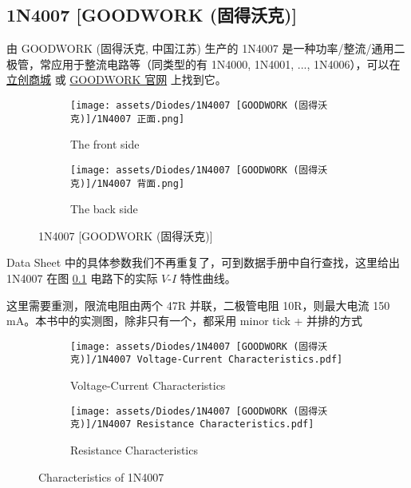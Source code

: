 \documentclass[UTF8]{report}
\begin{document}
\subsection{1N4007 [GOODWORK (固得沃克)]}

由 GOODWORK (固得沃克, 中国江苏) 生产的 1N4007 是一种功率/整流/通用二极管，常应用于整流电路等（同类型的有 1N4000, 1N4001, ..., 1N4006），可以在 \href{https://item.szlcsc.com/3428711.html}{立创商城} 或 \href{http://www.gk-goodwork.com/cn/product/1n4007.html}{GOODWORK 官网} 上找到它。
\begin{figure}[H]\centering
\begin{subfigure}[b]{0.5\columnwidth}\centering
    \texttt{[image: assets/Diodes/1N4007 [GOODWORK (固得沃克)]/1N4007 正面.png]}
    \caption{The front side}
\end{subfigure}\hfill
\begin{subfigure}[b]{0.5\columnwidth}\centering
    \texttt{[image: assets/Diodes/1N4007 [GOODWORK (固得沃克)]/1N4007 背面.png]}
    \caption{The back side}
\end{subfigure}
\caption{1N4007 [GOODWORK (固得沃克)]}
\end{figure}

Data Sheet 中的具体参数我们不再重复了，可到数据手册中自行查找，这里给出 1N4007 在图 \ref{} 电路下的实际 $V$-$I$ 特性曲线。

\begin{center}
    {\color{red} 这里需要重测，限流电阻由两个 47R 并联，二极管电阻 10R，则最大电流 150 mA。本书中的实测图，除非只有一个，都采用 minor tick + 并排的方式}
\end{center}

\begin{figure}[H]\centering
\begin{subfigure}[b]{0.5\columnwidth}\centering
    \texttt{[image: assets/Diodes/1N4007 [GOODWORK (固得沃克)]/1N4007 Voltage-Current Characteristics.pdf]}
    \caption{Voltage-Current Characteristics}
\end{subfigure}\hfill
\begin{subfigure}[b]{0.5\columnwidth}\centering
    \texttt{[image: assets/Diodes/1N4007 [GOODWORK (固得沃克)]/1N4007 Resistance Characteristics.pdf]}
    \caption{Resistance Characteristics}
\end{subfigure}
\caption{Characteristics of 1N4007}
\end{figure}
\end{document}
